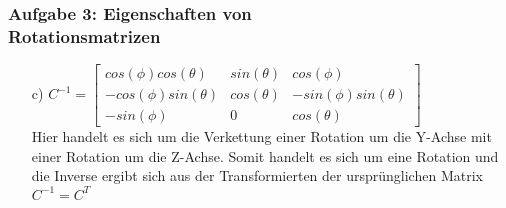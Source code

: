 \documentclass[accentcolor=tud9c,colorbacktitle,inverttitle,landscape,german,presentation,t]{tudbeamer}
\begin{document}
\begin{frame}
	\frametitle{Aufgabe 3: Eigenschaften von \\ Rotationsmatrizen} 
	\begin{itemize}
		\item[c)] $C^{-1}=\begin{bmatrix}
		cos(\phi)cos(\theta) & sin(\theta) & cos(\phi)\\
		-cos(\phi)sin(\theta) & cos(\theta) & -sin(\phi)sin(\theta) \\
		-sin(\phi) & 0 & cos(\theta) 
		\end{bmatrix} $ \\
		Hier handelt es sich um die Verkettung einer Rotation um die Y-Achse mit einer Rotation um die Z-Achse. Somit handelt es sich um eine Rotation und die Inverse ergibt sich aus der Transformierten der ursprünglichen Matrix $C^{-1}=C^T$
	\end{itemize}
\end{frame}
\end{document}
